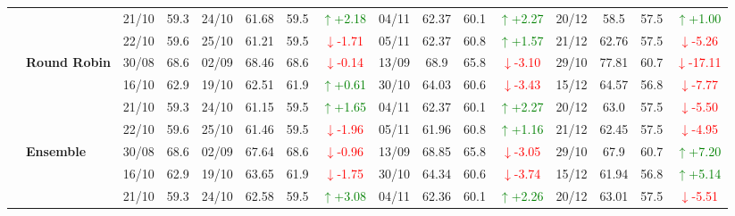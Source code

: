 {\begin{longtable}{llcc|cccc|cccc|cccc}
&
& 21/10 & 59.3 & 24/10 & 61.68 & 59.5 & \textcolor{green}{\(\uparrow\)+2.18} & 04/11 & 62.37 & 60.1 & \textcolor{green}{\(\uparrow\)+2.27} & 20/12 & 58.5 & 57.5 & \textcolor{green}{\(\uparrow\)+1.00} \\

&
& 22/10 & 59.6 & 25/10 & 61.21 & 59.5 & \textcolor{red}{\(\downarrow\)-1.71} & 05/11 & 62.37 & 60.8 & \textcolor{green}{\(\uparrow\)+1.57} & 21/12 & 62.76 & 57.5 & \textcolor{red}{\(\downarrow\)-5.26} \\
\cmidrule(lr){2-16}


& \textbf{Round Robin}
& 30/08 & 68.6 & 02/09 & 68.46 & 68.6 & \textcolor{red}{\(\downarrow\)-0.14} & 13/09 & 68.9 & 65.8 & \textcolor{red}{\(\downarrow\)-3.10} & 29/10 & 77.81 & 60.7 & \textcolor{red}{\(\downarrow\)-17.11} \\

&
& 16/10 & 62.9 & 19/10 & 62.51 & 61.9 & \textcolor{green}{\(\uparrow\)+0.61} & 30/10 & 64.03 & 60.6 & \textcolor{red}{\(\downarrow\)-3.43} & 15/12 & 64.57 & 56.8 & \textcolor{red}{\(\downarrow\)-7.77} \\

&
& 21/10 & 59.3 & 24/10 & 61.15 & 59.5 & \textcolor{green}{\(\uparrow\)+1.65} & 04/11 & 62.37 & 60.1 & \textcolor{green}{\(\uparrow\)+2.27} & 20/12 & 63.0 & 57.5 & \textcolor{red}{\(\downarrow\)-5.50} \\

&
& 22/10 & 59.6 & 25/10 & 61.46 & 59.5 & \textcolor{red}{\(\downarrow\)-1.96} & 05/11 & 61.96 & 60.8 & \textcolor{green}{\(\uparrow\)+1.16} & 21/12 & 62.45 & 57.5 & \textcolor{red}{\(\downarrow\)-4.95} \\
\cmidrule(lr){2-16}

& \textbf{Ensemble}
& 30/08 & 68.6 & 02/09 & 67.64 & 68.6 & \textcolor{red}{\(\downarrow\)-0.96} & 13/09 & 68.85 & 65.8 & \textcolor{red}{\(\downarrow\)-3.05} & 29/10 & 67.9 & 60.7 & \textcolor{green}{\(\uparrow\)+7.20} \\

&
& 16/10 & 62.9 & 19/10 & 63.65 & 61.9 & \textcolor{red}{\(\downarrow\)-1.75} & 30/10 & 64.34 & 60.6 & \textcolor{red}{\(\downarrow\)-3.74} & 15/12 & 61.94 & 56.8 & \textcolor{green}{\(\uparrow\)+5.14} \\

&
& 21/10 & 59.3 & 24/10 & 62.58 & 59.5 & \textcolor{green}{\(\uparrow\)+3.08} & 04/11 & 62.36 & 60.1 & \textcolor{green}{\(\uparrow\)+2.26} & 20/12 & 63.01 & 57.5 & \textcolor{red}{\(\downarrow\)-5.51} \\


\end{longtable}}
